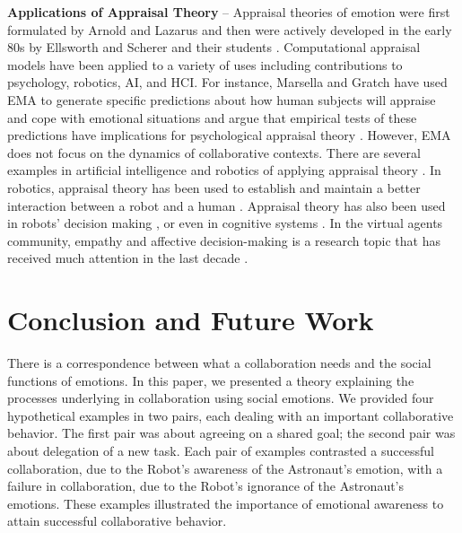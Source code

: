 \textbf{Applications of Appraisal Theory} -- Appraisal theories of emotion were
first formulated by Arnold \cite{arnold:emotion-personality} and Lazarus
\cite{lazarus:emotion-adaptation} and then were actively developed in the early
80s by Ellsworth and Scherer and their students
\cite{roseman:appraisal-theory,sander:systems-approach-appraisal,scherer:nature-function-emotion,scherer:emotions-emergent,scherer:appraisal-processes}.
Computational appraisal models have been applied to a variety of uses including
contributions to psychology, robotics, AI, and HCI. For instance, Marsella and
Gratch have used EMA \cite{marsella:ema-process-model} to generate specific
predictions about how human subjects will appraise and cope with emotional
situations and argue that empirical tests of these predictions have implications
for psychological appraisal theory \cite{gratch:assessing-appraisal}. However,
EMA does not focus on the dynamics of collaborative contexts. There are several
examples in artificial intelligence and robotics of applying appraisal theory
\cite{adam:bdi-emotional-companion,kim:model-hri-appraisal,marsella:ema-process-model}.
In robotics, appraisal theory has been used to establish and maintain a better
interaction between a robot and a human
\cite{kim:model-hri-appraisal,sander:systems-approach-appraisal,vogiatzis:robot-museum}.
Appraisal theory has also been used in robots' decision making
\cite{castro:autonomous-robot-fear}, or even in cognitive systems
\cite{hudlicka:emotinos-reasons,marinier:emotion-reinforcement}. In the virtual
agents community, empathy and affective decision-making is a research topic that
has received much attention in the last decade
\cite{scott:modeling-empathy-agent,paiva:agent-care,pontier:women-robot-men,velasquez:emotions-motivations-agents}.

\section{Conclusion and Future Work}

There is a correspondence between what a collaboration needs and the social
functions of emotions. In this paper, we presented a theory explaining the
processes underlying in collaboration using social emotions. We provided four
hypothetical examples in two pairs, each dealing with an important collaborative
behavior. The first pair was about agreeing on a shared goal; the second pair
was about delegation of a new task. Each pair of examples contrasted a
successful collaboration, due to the Robot's awareness of the Astronaut's
emotion, with a failure in collaboration, due to the Robot's ignorance of the
Astronaut's emotions. These examples illustrated the importance of
emotional awareness to attain successful collaborative behavior.

